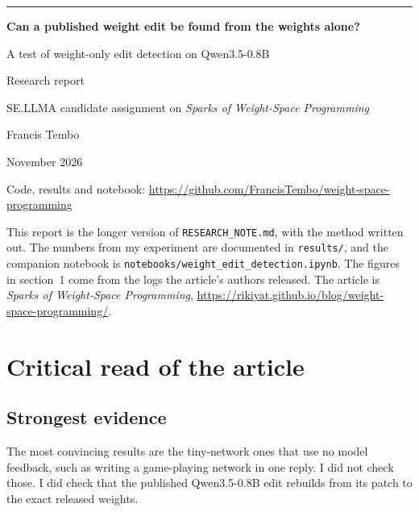 \documentclass[11pt,a4paper]{article}
\begin{document}
\begin{titlepage}
\thispagestyle{empty}
\vspace*{3.2cm}
{\color{accent}\rule{2.4cm}{2.5pt}}\par
\vspace{1.0cm}
{\fontsize{27}{33}\selectfont\bfseries Can a published weight edit be found from the weights alone?\par}
\vspace{0.9cm}
{\Large A test of weight-only edit detection on Qwen3.5-0.8B\par}
\vspace{2.6cm}
{\large Research report\par}
\vspace{0.25cm}
{\large SE.LLMA candidate assignment on \emph{Sparks of Weight-Space Programming}\par}
\vfill
{\large Francis Tembo\par}
\vspace{0.25cm}
{\large November 2026\par}
\vspace{1.0cm}
{\small Code, results and notebook: \url{https://github.com/FrancisTembo/weight-space-programming}\par}
\end{titlepage}

This report is the longer version of \texttt{RESEARCH\_NOTE.md}, with the method written out.
The numbers from my experiment are documented in \texttt{results/}, and the companion notebook is
\texttt{notebooks/weight\_edit\_detection.ipynb}. The figures in section~1 come from the logs the
article's authors released. The article is \emph{Sparks of Weight-Space Programming},
\url{https://rikiyat.github.io/blog/weight-space-programming/}.

\section{Critical read of the article}

\subsection{Strongest evidence}

The most convincing results are the tiny-network ones that use no model feedback, such as writing a
game-playing network in one reply. I did not check those. I did check that the published
Qwen3.5-0.8B edit rebuilds from its patch to the exact released weights.
\end{document}
